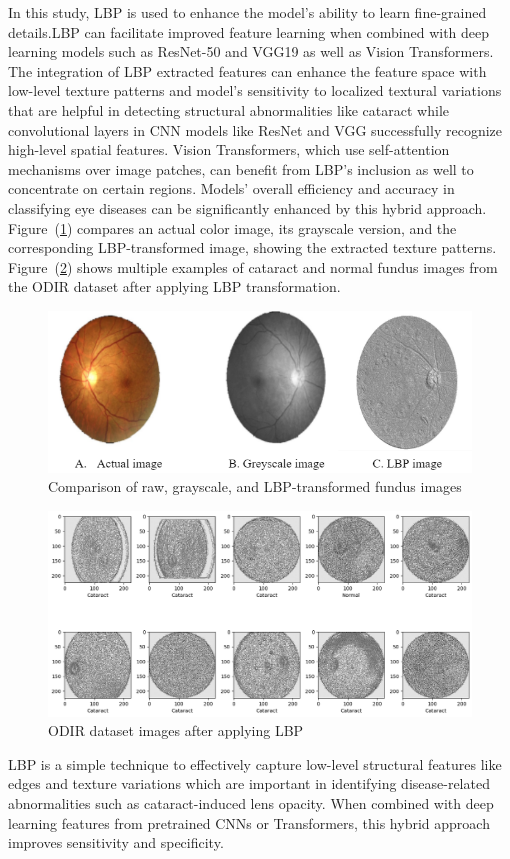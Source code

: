\documentclass{ijclclp}
\begin{document}
In this study, LBP is used to enhance the model's ability to learn fine-grained details.LBP can facilitate improved feature learning when combined with deep learning models such as ResNet-50 and VGG19 as well as Vision Transformers. The integration of LBP extracted features can enhance the feature space with low-level texture patterns and model’s sensitivity to localized textural variations that are helpful in detecting structural abnormalities like cataract while convolutional layers in CNN models like ResNet and VGG successfully recognize high-level spatial features. Vision Transformers, which use self-attention mechanisms over image patches, can benefit from LBP's inclusion as well to concentrate on certain regions. Models' overall efficiency and accuracy in classifying eye diseases can be significantly enhanced by this hybrid approach. Figure~(\ref{fig:actualvsgrayscale}) compares an actual color image, its grayscale version, and the corresponding LBP-transformed image, showing the extracted texture patterns. Figure~(\ref{fig:imgafterlbp}) shows multiple examples of cataract and normal fundus images from the ODIR dataset after applying LBP transformation.
\begin{figure}[ht]
    \centering
    \includegraphics[width=0.64\linewidth]{image3.png}
    \caption{Comparison of raw, grayscale, and LBP-transformed fundus images}
    \label{fig:actualvsgrayscale}
\end{figure}

\begin{figure}[ht]
    \centering
    \includegraphics[width=0.71\linewidth]{image4.png}
    \caption{ODIR dataset images after applying LBP}
    \label{fig:imgafterlbp}
\end{figure}
LBP is a simple technique to effectively capture low-level structural features like edges and texture variations which are important in identifying disease-related abnormalities such as cataract-induced lens opacity. When combined with deep learning features from pretrained CNNs or Transformers, this hybrid approach improves sensitivity and specificity.
    \newline
\end{document}
